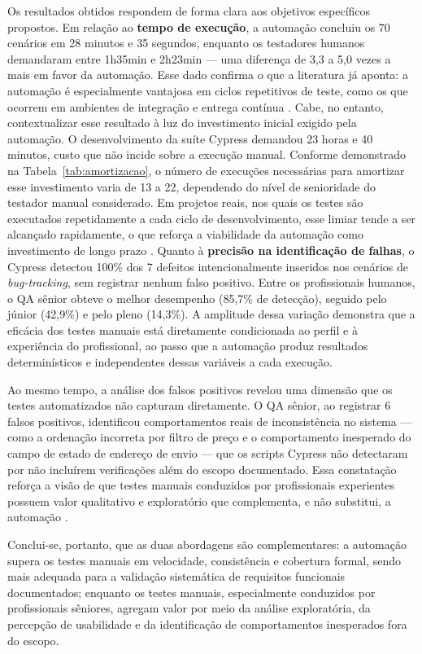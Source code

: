 \documentclass{UNESC}
\begin{document}
Os resultados obtidos respondem de forma clara aos objetivos específicos propostos. Em relação ao \textbf{tempo de execução}, a automação concluiu os 70 cenários em 28 minutos e 35 segundos, enquanto os testadores humanos demandaram entre 1h35min e 2h23min — uma diferença de 3,3 a 5,0 vezes a mais em favor da automação. Esse dado confirma o que a literatura já aponta: a automação é especialmente vantajosa em ciclos repetitivos de teste, como os que ocorrem em ambientes de integração e entrega contínua \cite{matos2020esus}.
Cabe, no entanto, contextualizar esse resultado à luz do investimento inicial exigido pela automação. O desenvolvimento da suíte Cypress demandou 23 horas e 40 minutos, custo que não incide sobre a execução manual. Conforme demonstrado na Tabela~\ref{tab:amortizacao}, o número de execuções necessárias para amortizar esse investimento varia de 13 a 22, dependendo do nível de senioridade do testador manual considerado. Em projetos reais, nos quais os testes são executados repetidamente a cada ciclo de desenvolvimento, esse limiar tende a ser alcançado rapidamente, o que reforça a viabilidade da automação como investimento de longo prazo \cite{gandini2002}.
Quanto à \textbf{precisão na identificação de falhas}, o Cypress detectou 100\% dos 7 defeitos intencionalmente inseridos nos cenários de \textit{bug-tracking}, sem registrar nenhum falso positivo. Entre os profissionais humanos, o QA sênior obteve o melhor desempenho (85,7\% de detecção), seguido pelo júnior (42,9\%) e pelo pleno (14,3\%). A amplitude dessa variação demonstra que a eficácia dos testes manuais está diretamente condicionada ao perfil e à experiência do profissional, ao passo que a automação produz resultados determinísticos e independentes dessas variáveis a cada execução.

Ao mesmo tempo, a análise dos falsos positivos revelou uma dimensão que os testes automatizados não capturam diretamente. O QA sênior, ao registrar 6 falsos positivos, identificou comportamentos reais de inconsistência no sistema — como a ordenação incorreta por filtro de preço e o comportamento inesperado do campo de estado de endereço de envio — que os scripts Cypress não detectaram por não incluírem verificações além do escopo documentado. Essa constatação reforça a visão de que testes manuais conduzidos por profissionais experientes possuem valor qualitativo e exploratório que complementa, e não substitui, a automação \cite{PRESSMAN}.

Conclui-se, portanto, que as duas abordagens são complementares: a automação supera os testes manuais em velocidade, consistência e cobertura formal, sendo mais adequada para a validação sistemática de requisitos funcionais documentados; enquanto os testes manuais, especialmente conduzidos por profissionais sêniores, agregam valor por meio da análise exploratória, da percepção de usabilidade e da identificação de comportamentos inesperados fora do escopo.
\end{document}
